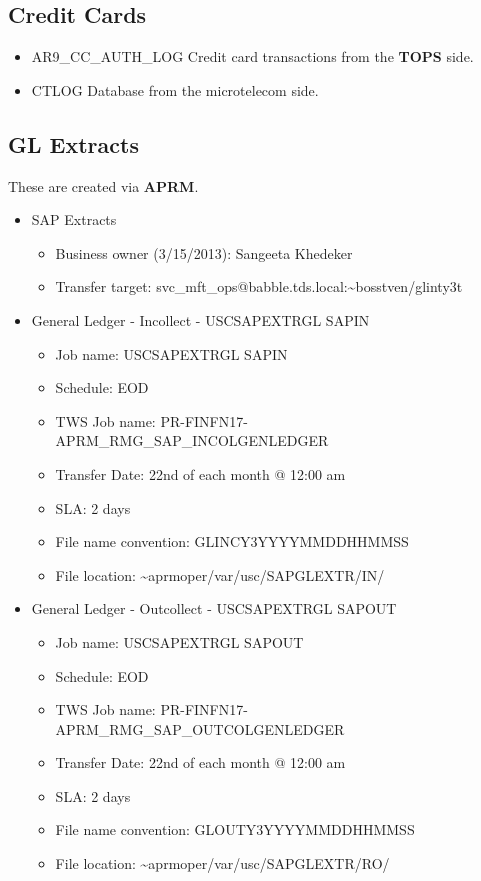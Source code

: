 \documentclass[12pt,twoside]{article}
\begin{document}
\subsection{Credit Cards}
\label{sec:orgheadline66}
\begin{itemize}
\item AR9\_CC\_AUTH\_LOG
   Credit card transactions from the \textbf{TOPS} side.
\item CTLOG
Database from the microtelecom side.
\end{itemize}

\subsection{GL Extracts}
\label{sec:orgheadline67}
These are created via \textbf{APRM}.
\small
\begin{itemize}
\item SAP Extracts
\begin{itemize}
\item Business owner (3/15/2013): Sangeeta Khedeker
\item Transfer target:
svc\_mft\_ops@babble.tds.local:\textasciitilde{}bosstven/glinty3t
\end{itemize}

\item General Ledger - Incollect - USCSAPEXTRGL SAPIN
\begin{itemize}
\item Job name: USCSAPEXTRGL SAPIN
\item Schedule: EOD
\item TWS Job name: PR-FINFN17-APRM\_RMG\_SAP\_INCOLGENLEDGER
\item Transfer Date: 22nd of each month @ 12:00 am
\item SLA: 2 days
\item File name convention: GLINCY3YYYYMMDDHHMMSS
\item File location: \textasciitilde{}aprmoper/var/usc/SAPGLEXTR/IN/
\end{itemize}

\item General Ledger - Outcollect - USCSAPEXTRGL SAPOUT
\begin{itemize}
\item Job name: USCSAPEXTRGL SAPOUT
\item Schedule: EOD
\item TWS Job name: PR-FINFN17-APRM\_RMG\_SAP\_OUTCOLGENLEDGER
\item Transfer Date: 22nd of each month @ 12:00 am
\item SLA: 2 days
\item File name convention: GLOUTY3YYYYMMDDHHMMSS
\item File location: \textasciitilde{}aprmoper/var/usc/SAPGLEXTR/RO/
\end{itemize}


\end{itemize}
\end{document}
